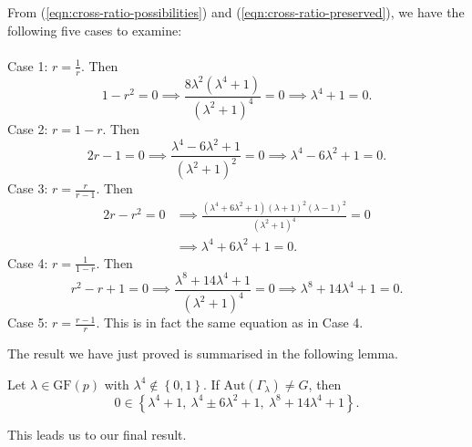 \documentclass[ALCO, Unicode]{cedram}
\newcommand{\Aut}{\mathrm{Aut}}
\newcommand{\GF}{\mathrm{GF}}
\begin{document}
From (\ref{eqn:cross-ratio-possibilities}) and (\ref{eqn:cross-ratio-preserved}), we have the following five cases to examine: \\\\
Case 1: $r = \frac{1}{r}$. Then
\begin{displaymath}
1 - r^2 = 0 \implies \frac{8 \lambda^2 \left(\lambda^4 + 1 \right)}{\left(\lambda^2 + 1 \right)^4} = 0 \implies \lambda^4 + 1 = 0.
\end{displaymath}
Case 2: $r = 1-r$. Then
\begin{displaymath}
2r - 1 = 0 \implies \frac{\lambda^4 - 6 \lambda^2 + 1}{\left(\lambda^2 + 1 \right)^2} = 0 \implies \lambda^4 - 6 \lambda^2 + 1 = 0.
\end{displaymath}
Case 3: $r = \frac{r}{r-1}$. Then
\begin{align*}
2r - r^2 = 0 &\implies \frac{\left(\lambda^4 + 6 \lambda^2 + 1 \right) \left(\lambda + 1 \right)^2 \left(\lambda - 1 \right)^2}{\left(\lambda^2 + 1 \right)^4} = 0 \\ &\implies \lambda^4 + 6 \lambda^2 + 1 = 0.
\end{align*}
Case 4: $r = \frac{1}{1-r}$. Then
\begin{displaymath}
r^2 - r + 1 = 0 \implies \frac{\lambda^8 + 14 \lambda^4 + 1}{\left(\lambda^2 + 1 \right)^4} = 0 \implies \lambda^8 + 14 \lambda^4 + 1 = 0.
\end{displaymath}
Case 5: $r = \frac{r-1}{r}$. This is in fact the same equation as in Case 4.

The result we have just proved is summarised in the following lemma.
\begin{lemma} \label{lm:Lambda_lambda}
Let $\lambda \in \GF{\left(p \right)}$ with $\lambda^4 \notin \left\{0, 1 \right\}$. If $\Aut{\left(\Gamma_\lambda \right)} \neq G$, then
\begin{displaymath}
0 \in {\left\{\lambda^4 + 1,\ \lambda^4 \pm 6 \lambda^2 + 1,\ \lambda^8 + 14 \lambda^4 + 1 \right\}}.
\end{displaymath}
\end{lemma}

This leads us to our final result.
\end{document}
